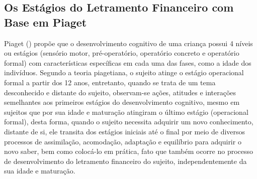 \subsection{Os Estágios do Letramento Financeiro com Base em Piaget}
Piaget (\citeyear{piaget1971}) propõe que o desenvolvimento cognitivo de uma criança possui 4 níveis ou estágios (sensório motor, pré-operatório, operatório concreto e operatório formal) com características específicas em cada uma das fases, como a idade dos indivíduos. Segundo a teoria piagetiana, o sujeito atinge o estágio operacional formal a partir dos 12 anos, entretanto, quando se trata de um tema desconhecido e distante do sujeito, observam-se ações, atitudes e interações semelhantes aos primeiros estágios do desenvolvimento cognitivo, mesmo em sujeitos que por sua idade e maturação atingiram o último estágio (operacional formal), desta forma, quando o sujeito necessita adquirir um novo conhecimento, distante de si, ele transita dos estágios iniciais até o final por meio de diversos processos de assimilação, acomodação, adaptação e equilíbrio para adquirir o novo saber, bem como colocá-lo em prática, fato que também ocorre no processo de desenvolvimento do letramento financeiro do sujeito, independentemente da sua idade e maturação.

